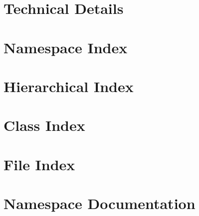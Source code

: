\documentclass[twoside]{book}
\newcommand{\+}{\discretionary{\mbox{\scriptsize$\hookleftarrow$}}{}{}}
\begin{document}
\chapter{Technical Details}
\label{md_pages_technical_details}

\chapter{Namespace Index}

\chapter{Hierarchical Index}

\chapter{Class Index}

\chapter{File Index}

\chapter{Namespace Documentation}




\end{document}
